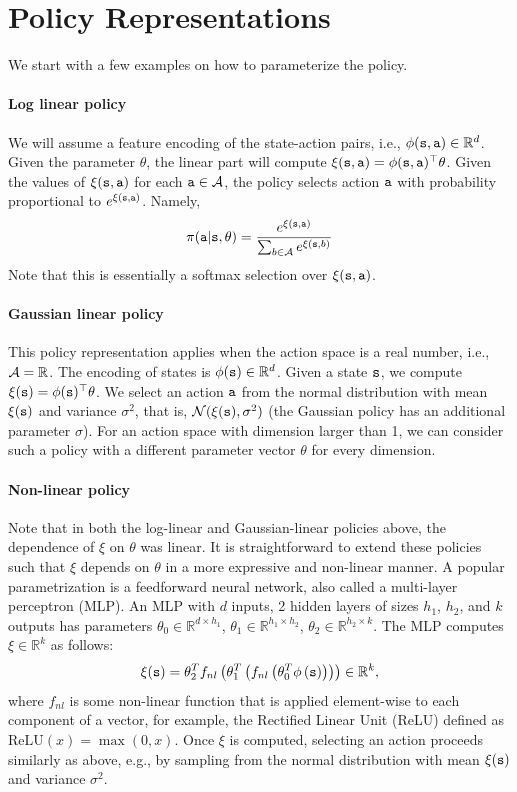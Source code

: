 \section{Policy Representations}
We start with a few examples on how to parameterize the policy.
\paragraph{Log linear policy} We will assume a feature encoding
of the state-action pairs, i.e., $\phi({\tt s},{\tt a})\in \mathbb{R}^{d}$. Given the parameter $\theta$, the linear part will compute $\xi({\tt s},{\tt a})=\phi({\tt s},{\tt a})^\top \theta$. Given the values of $\xi({\tt s},{\tt a})$ for each ${\tt a}\in \mathcal{A}$, the policy selects action ${\tt a}$ with probability proportional to
$e^{\xi({\tt s},{\tt a})}$. Namely,
\[
\pi({\tt a}|{\tt s},\theta)=
\frac{e^{\xi({\tt s},{\tt a})}}{\sum_{b\in
\mathcal{A}}e^{\xi({\tt s},b)}}
\]
Note that this is essentially a softmax selection over $\xi({\tt s},{\tt a})$.

\paragraph{Gaussian linear policy} This policy representation applies when the action
space is a real number, i.e., $\mathcal{A}=\mathbb{R}$. The encoding of states is $\phi({\tt s})\in \mathbb{R}^{d}$. Given a state ${\tt s}$,
we compute $\xi({\tt s})=\phi({\tt s})^\top\theta$. We select an
action ${\tt a}$ from the normal distribution with mean
$\xi({\tt s})$ and variance $\sigma^2$, that is, $\mathcal{N}(\xi({\tt s}),\sigma^2)$ (the Gaussian policy has an additional parameter $\sigma$). For an action space with dimension larger than 1, we can consider such a policy with a different parameter vector $\theta$ for every dimension.

\paragraph{Non-linear policy} Note that in both the log-linear and Gaussian-linear policies above, the dependence of $\xi$ on $\theta$ was linear. It is straightforward to extend these policies such that $\xi$ depends on $\theta$ in a more expressive and non-linear manner. A popular parametrization is a feedforward neural network, also called a multi-layer perceptron (MLP). An MLP with $d$ inputs, 2 hidden layers of sizes $h_1$, $h_2$, and $k$ outputs has parameters $\theta_0 \in \mathbb{R}^{d \times h_1}$, $\theta_1 \in \mathbb{R}^{h_1 \times h_2}$, $\theta_2 \in \mathbb{R}^{h_2 \times k}$. The MLP computes $\xi\in \mathbb{R}^{k}$ as follows:
\begin{equation*}
    \xi({\tt s}) = \theta_2^T f_{nl}\left(\theta_1^T\left( f_{nl}\left(\theta_0^T \phi\left({\tt s} \right)\right)\right)\right) \in \mathbb{R}^{k},
\end{equation*}
where $f_{nl}$ is some non-linear function that is applied element-wise to each component of a vector, for example, the Rectified Linear Unit (ReLU) defined as $\text{ReLU}(x) = \max(0, x)$. Once $\xi$ is computed, selecting an
action proceeds similarly as above, e.g., by sampling from the normal distribution with mean
$\xi({\tt s})$ and variance $\sigma^2$.

